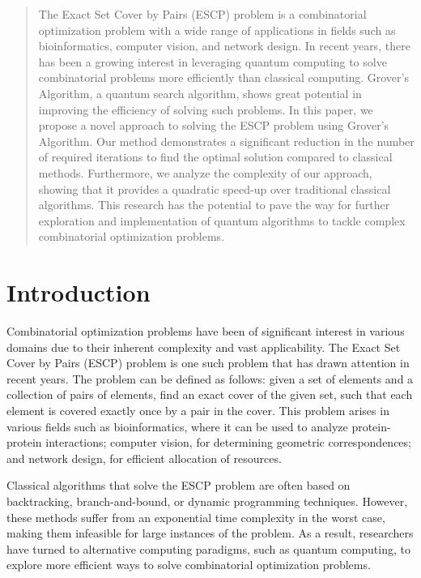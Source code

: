 \begin{abstract}
The Exact Set Cover by Pairs (ESCP) problem is a combinatorial optimization problem with a wide range of applications in fields such as bioinformatics, computer vision, and network design. In recent years, there has been a growing interest in leveraging quantum computing to solve combinatorial problems more efficiently than classical computing. Grover's Algorithm, a quantum search algorithm, shows great potential in improving the efficiency of solving such problems. In this paper, we propose a novel approach to solving the ESCP problem using Grover's Algorithm. Our method demonstrates a significant reduction in the number of required iterations to find the optimal solution compared to classical methods. Furthermore, we analyze the complexity of our approach, showing that it provides a quadratic speed-up over traditional classical algorithms. This research has the potential to pave the way for further exploration and implementation of quantum algorithms to tackle complex combinatorial optimization problems.

\end{abstract}

\section{Introduction}

Combinatorial optimization problems have been of significant interest in various domains due to their inherent complexity and vast applicability. The Exact Set Cover by Pairs (ESCP) problem is one such problem that has drawn attention in recent years. The problem can be defined as follows: given a set of elements and a collection of pairs of elements, find an exact cover of the given set, such that each element is covered exactly once by a pair in the cover. This problem arises in various fields such as bioinformatics, where it can be used to analyze protein-protein interactions; computer vision, for determining geometric correspondences; and network design, for efficient allocation of resources.

Classical algorithms that solve the ESCP problem are often based on backtracking, branch-and-bound, or dynamic programming techniques. However, these methods suffer from an exponential time complexity in the worst case, making them infeasible for large instances of the problem. As a result, researchers have turned to alternative computing paradigms, such as quantum computing, to explore more efficient ways to solve combinatorial optimization problems.

